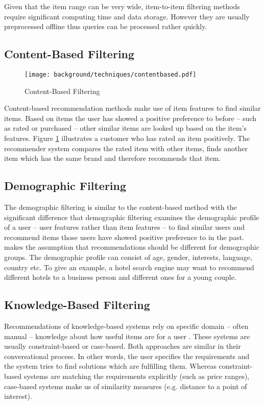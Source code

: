 Given that the item range can be very wide, item-to-item filtering methods require significant computing time and data storage. However they are usually preprocessed offline thus queries can be processed rather quickly.

\subsection{Content-Based Filtering}

\begin{figure}[ht]
    \texttt{[image: background/techniques/contentbased.pdf]}
    \caption{Content-Based Filtering}
    \label{fig:contentbased}
\end{figure}

Content-based recommendation methods make use of item features to find similar items. Based on items the user has showed a positive preference to before -- such as rated or purchased -- other similar items are looked up based on the item's features. Figure \ref{fig:contentbased} illustrates a customer who has rated an item positively. The recommender system compares the rated item with other items, finds another item which has the same brand and therefore recommends that item.

\subsection{Demographic Filtering}

The demographic filtering is similar to the content-based method with the significant difference that demographic filtering examines the demographic profile of a user -- user features rather than item features -- to find similar users and recommend items those users have showed positive preference to in the past. \citet{ricci11} makes the assumption that recommendations should be different for demographic groups. The demographic profile can consist of age, gender, interests, language, country etc. To give an example, a hotel search engine may want to recommend different hotels to a business person and different ones for a young couple.

\subsection{Knowledge-Based Filtering}

Recommendations of knowledge-based systems rely on specific domain -- often manual -- knowledge about how useful items are for a user \cite{ricci11}. These systems are usually constraint-based or case-based. Both approaches are similar in their conversational process. In other words, the user specifies the requirements and the system tries to find solutions which are fulfilling them. Whereas constraint-based systems are matching the requirements explicitly (such as price ranges), case-based systems make us of similarity measures (e.g. distance to a point of interest).

